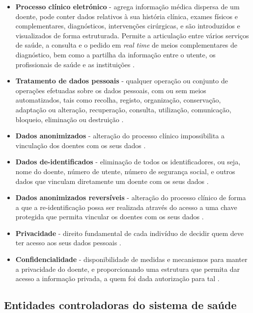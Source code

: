 \documentclass[conference]{IEEEtran}
\begin{document}
\begin{itemize}
	\item \textbf{Processo clínico eletrónico} - agrega informação médica dispersa de um doente, pode conter dados relativos à sua história clínica, exames físicos e complementares, diagnósticos, intervenções cirúrgicas, e são introduzidos e visualizados de forma estruturada. Permite a articulação entre vários serviços de saúde, a consulta e o pedido em \textit{real time} de meios complementares de diagnóstico, bem como a partilha da informação entre o utente, os profissionais de saúde e as instituições \cite{CNPDinfsaude2014}.
	
	\item \textbf{Tratamento de dados pessoais} - qualquer operação ou conjunto de operações efetuadas sobre os dados pessoais, com ou sem meios automatizados, tais como recolha, registo, organização, conservação, adaptação ou alteração, recuperação, consulta, utilização, comunicação, bloqueio, eliminação ou destruição \cite{parecerERS2015}.
	
	\item \textbf{Dados anonimizados} - alteração do processo clínico impossibilita a vinculação dos doentes com os seus dados \cite{safran2007toward}.
	
	\item \textbf{Dados de-identificados} - eliminação de todos os identificadores, ou seja, nome do doente, número de utente, número de segurança social, e outros dados que vinculam diretamente um doente com os seus dados \cite{safran2007toward}.
	
	\item \textbf{Dados anonimizados reversíveis} - alteração do processo clínico de forma a que a re-identificação possa ser realizada através do acesso a uma chave protegida que permita vincular os doentes com os seus dados \cite{safran2007toward}.
	
	\item \textbf{Privacidade} - direito fundamental de cada indivíduo de decidir quem deve ter acesso aos seus dados pessoais \cite{segurancaSI}.
	
	\item \textbf{Confidencialidade} - disponibilidade de medidas e mecanismos para manter a privacidade do doente, e proporcionando uma estrutura que permita dar acesso a informação privada, a quem foi dada autorização para tal \cite{segurancaSI}.
	
\end{itemize}

\subsection{Entidades controladoras do sistema de saúde}
\end{document}
